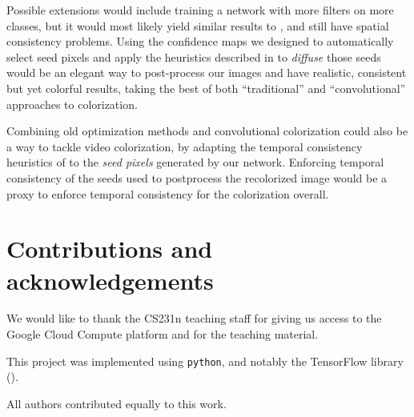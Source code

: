 \documentclass[10pt,twocolumn,letterpaper]{article}
\begin{document}
Possible extensions would include training a network with more filters on more classes, but it would most likely yield similar results to \cite{zhang2016colorful}, and still have spatial consistency problems. Using the confidence maps we designed to automatically select seed pixels and apply the heuristics described in \cite{levin2004colorization} to \textit{diffuse} those seeds would be an elegant way to post-process our images and have realistic, consistent but yet colorful results, taking the best of both ``traditional'' and ``convolutional'' approaches to colorization.

Combining old optimization methods and convolutional colorization could also be a way to tackle video colorization, by adapting the temporal consistency heuristics of \cite{zhu2017video} to the \textit{seed pixels} generated by our network. Enforcing temporal consistency of the seeds used to postprocess the recolorized image would be a proxy to enforce temporal consistency for the colorization overall.


\section*{Contributions and acknowledgements}

We would like to thank the CS231n teaching staff for giving us access to the Google Cloud Compute platform and for the teaching material.

This project was implemented using \texttt{python}, and notably the  TensorFlow library (\cite{abadi2016tensorflow}).

All authors contributed equally to this work.

{\small


}
\end{document}
